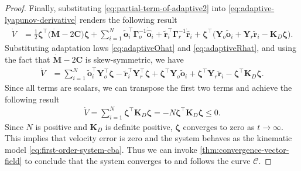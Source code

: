 \begin{proof}
    Finally, substituting \eqref{eq:partial-term-of-adaptive2} into \eqref{eq:adaptive-lyapunov-derivative} renders the following result
    \begin{align}
        \dot{V} &= \frac{1}{2}\boldsymbol{\zeta}^\top \bigl(\dot{\mathbf{M}}- 2\mathbf{C}\bigr) \boldsymbol{\zeta} + \sum\limits_{i=1}^{N} \widetilde{\mathbf{o}}_i^\top \boldsymbol{\Gamma}_o^{-1} \dot{\hat{\mathbf{o}}}_i + \widetilde{\mathbf{r}}_i^\top \boldsymbol{\Gamma}_r^{-1}\dot{\hat{\mathbf{r}}}_i + \boldsymbol{\zeta}^\top\bigl(\mathbf{Y}_o\widetilde{\mathbf{o}}_i + \mathbf{Y}_r\widetilde{\mathbf{r}}_i - \mathbf{K}_D\boldsymbol{\zeta} \bigr).
    \end{align}
    Substituting adaptation laws \eqref{eq:adaptiveOhat} and \eqref{eq:adaptiveRhat}, and using the fact that $\dot{\mathbf{M}} - 2\mathbf{C}$ is skew-symmetric, we have
    \begin{align}
        \dot{V} &= \sum\limits_{i=1}^{N} \widetilde{\mathbf{o}}_i^\top \mathbf{Y}^\top_o\boldsymbol{\zeta}  - \widetilde{\mathbf{r}}_i^\top\mathbf{Y}^\top_r\boldsymbol{\zeta} + \boldsymbol{\zeta}^\top\mathbf{Y}_o\widetilde{\mathbf{o}}_i + \boldsymbol{\zeta}^\top\mathbf{Y}_r\widetilde{\mathbf{r}}_i - \boldsymbol{\zeta}^\top\mathbf{K}_D\boldsymbol{\zeta}.
    \end{align}
    Since all terms are scalars, we can transpose the first two terms and achieve the following result
    \begin{align}
        \dot{V} = \sum\limits_{i=1}^{N}\boldsymbol{\zeta}^\top\mathbf{K}_D\boldsymbol{\zeta} = -N\boldsymbol{\zeta}^\top\mathbf{K}_D\boldsymbol{\zeta} \le 0.
    \end{align}
    Since $N$ is positive and $\mathbf{K}_D$ is definite positive, $\boldsymbol{\zeta}$ converges to zero as $t\to\infty$. This implies that velocity error is zero and the system behaves as the kinematic model \eqref{eq:first-order-system-cba}. Thus we can invoke \cref{thm:convergence-vector-field} to conclude that the system converges to and follows the curve $\mathcal{C}$.
\end{proof}